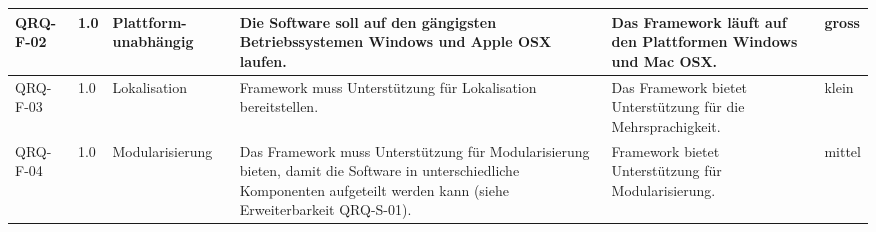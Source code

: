 \begin{landscape}
\begin{longtable}{|p{1.8cm}|p{0.7cm}|p{2.5cm}|p{7cm}|p{4cm}|p{0.9cm}|}
   QRQ-F-02 & 1.0 & Plattform-unabhängig &  Die Software soll auf den gängigsten Betriebssystemen Windows und Apple OSX laufen. & Das Framework läuft auf den Plattformen Windows und Mac OSX. & gross \\\hline

   QRQ-F-03 & 1.0 & Lokalisation & Framework muss Unterstützung für Lokalisation bereitstellen. & Das Framework bietet Unterstützung für die Mehrsprachigkeit. &klein \\\hline

   QRQ-F-04 & 1.0 & Modularisierung & Das Framework muss Unterstützung für Modularisierung bieten, damit die Software in unterschiedliche Komponenten aufgeteilt werden kann (siehe Erweiterbarkeit QRQ-S-01). & Framework bietet Unterstützung für Modularisierung.&mittel \\\hline

\end{longtable}
\end{landscape}


